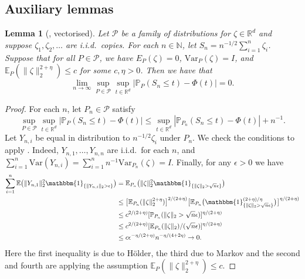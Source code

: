 \documentclass[aos]{imsart}
\newcommand{\ind}{\mathbbm{1}}
\renewcommand{\Pr}{\mathbb{P}}
\newcommand{\R}{\mathbb{R}}
\newcommand{\E}{\mathbb{E}}
\newcommand{\Var}{\mathrm{Var}}
\newtheorem{lemma}[theorem]{Lemma}
\begin{document}
	\subsection{Auxiliary lemmas}
	\begin{lemma}[{\citet[Supp. Lem.~18]{ShahGCM}}, vectorised]
		\label{lem:uniformCLT}
		Let $\mathcal{P}$ be a family of distributions for $\zeta\in\R^d$ and suppose $\zeta_1, \zeta_2,\dots$ are i.i.d.\ copies. For each $n\in\mathbb{N}$, let $S_n=n^{-1/2}\sum_{i=1}^n \zeta_i$. Suppose that for all $P\in\mathcal{P}$, we have $E_P(\zeta)=0$, $\Var_P(\zeta)=I$, and $\E_P(\|\zeta\|_2^{2+\eta})\leq c$ for some $c, \eta>0$. Then we have that \begin{equation*}
			\lim_{n\to\infty} \sup_{P\in\mathcal{P}} \sup_{t\in\R^d} |\Pr_P(S_n\leq t)-\Phi(t)| = 0.
		\end{equation*}
	\end{lemma}
	\begin{proof}
		For each $n$, let $P_n\in\mathcal{P}$ satisfy \begin{equation*}
			\sup_{P\in\mathcal{P}} \sup_{t\in\R^d} |\Pr_P(S_n\leq t)-\Phi(t)| \leq \sup_{t\in\R^d} |\Pr_{P_n}(S_n\leq t)-\Phi(t)| + n^{-1}.
		\end{equation*}
		Let $Y_{n,i}$ be equal in distribution to $n^{-1/2}\zeta_i$ under $P_n$. We check the conditions to apply \citet[Prop.~2.27]{vanderVaartAsymptotic}. Indeed, $Y_{n,1},\dots, Y_{n,n}$ are i.i.d.\ for each $n$, and $\sum_{i=1}^n \Var(Y_{n,i}) = \sum_{i=1}^n n^{-1} \Var_{P_n}(\zeta)=I$. Finally, for any $\epsilon>0$ we have \begin{align*}
			\sum_{i=1}^n \E\big(\|Y_{n,1}\|_2^2 \ind_{\{\|Y_{n,i}\|_2>\epsilon\}} \big) &= \E_{P_n}\big(\|\zeta\|_2^2 \ind_{\{\|\zeta\|_2>\sqrt{n} \epsilon\}}\big)\\
			&\leq \big[\E_{P_n}(\|\zeta\|_2^{2+\eta})\big]^{2/(2+\eta)} \big[\E_{P_n}\big(\ind_{\{\|\zeta\|_2>\sqrt{n} \epsilon\}}^{(2+\eta)/\eta}\big)\big]^{\eta/(2+\eta)}\\
			&\leq c^{2/(2+\eta)} [\Pr_{P_n}(\|\zeta\|_2>\sqrt{n} \epsilon)]^{\eta/(2+\eta)}\\
			&\leq c^{2/(2+\eta)} [\E_{P_n}(\|\zeta\|_2)/(\sqrt{n}\epsilon)]^{\eta/(2+\eta)}\\
			&\leq c \epsilon^{-\eta/(2+\eta)}  n^{-\eta/(4+2\eta)} \to 0.
		\end{align*}
		Here the first inequality is due to H\"older, the third due to Markov and the second and fourth are applying the assumption $\E_P(\|\zeta\|_2^{2+\eta})\leq c$.
	\end{proof}
	
\end{document}
